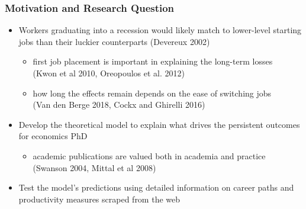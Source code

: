 \documentclass[10pt,svgnames,fragile]{beamer}
\begin{document}
\begin{frame}
	\frametitle{Motivation and Research Question} 
	\begin{itemize}
		
		\item Workers graduating into a recession would likely match to lower-level starting jobs than their luckier counterparts (Devereux 2002)
		\begin{itemize}
			\vspace{1 mm}
			\item first job placement is important in explaining the long-term losses \\ (Kwon et al 2010, Oreopoulos et al. 2012)
			\vspace{1 mm}
			\item how long the effects remain depends on the ease of switching jobs  \\(Van den Berge 2018, Cockx and Ghirelli 2016)
		\end{itemize}
\vfill
		\item Develop the theoretical model to explain what drives the persistent outcomes for economics PhD
		\begin{itemize}
	\vspace{1 mm}
			\item academic publications are valued both in academia and practice\\ (Swanson 2004, Mittal et al 2008)
		\end{itemize}
\vfill
		\item Test the model's predictions using detailed information on career paths and productivity measures  scraped from  the web
\vfill
	\end{itemize}
\end{frame}
\end{document}
